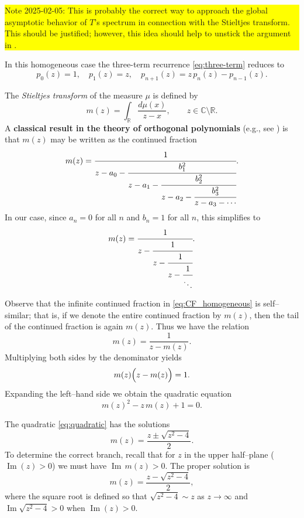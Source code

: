 \documentclass[letterpaper,11pt,oneside,reqno]{article}
\numberwithin{equation}{section}
\theoremstyle{definition}
\begin{document}
\colorbox{yellow}{\parbox{.7\textwidth}{Note 2025-02-05:
This is probably the correct way to approach the global asymptotic behavior of 
$T$'s spectrum in connection with the Stieltjes transform. 
This should be justified; however, this idea should help to unstick 
the argument in .}}

In this homogeneous case the three-term recurrence \eqref{eq:three-term} reduces to
\[
p_0(z)=1,\quad p_1(z)=z,\quad p_{n+1}(z)=z\,p_n(z)-p_{n-1}(z).
\]

\medskip
The \emph{Stieltjes transform} of the measure \(\mu\) is defined by
\[
m(z)=\int_{\mathbb{R}}\frac{d\mu(x)}{z-x},\qquad z\in\mathbb{C}\setminus\mathbb{R}.
\]
A \textbf{classical result in the theory of orthogonal polynomials}
(e.g., see \cite{sokal2020euler})
is that \(m(z)\) may be written as the continued fraction
\begin{equation}\label{eq:CF}
m(z)=\cfrac{1}{z-a_0-\cfrac{b_1^2}{z-a_1-\cfrac{b_2^2}{z-a_2-\cfrac{b_3^2}{z-a_3-\cdots}}}}.
\end{equation}
In our case, since \(a_n=0\) for all \(n\) and \(b_n=1\) for all \(n\), this simplifies to
\begin{equation}\label{eq:CF_homogeneous}
m(z)=\cfrac{1}{z-\cfrac{1}{z-\cfrac{1}{z-\cfrac{1}{\ddots}}}}.
\end{equation}


Observe that the infinite continued fraction in \eqref{eq:CF_homogeneous} is self--similar; that is, if we denote the entire continued fraction by \(m(z)\), then the tail of the continued fraction is again \(m(z)\). Thus we have the relation
\[
m(z)=\frac{1}{z-m(z)}.
\]
Multiplying both sides by the denominator yields
\[
m(z)\Bigl(z-m(z)\Bigr)=1.
\]
Expanding the left--hand side we obtain the quadratic equation
\begin{equation}\label{eq:quadratic}
m(z)^2-z\,m(z)+1=0.
\end{equation}


The quadratic \eqref{eq:quadratic} has the solutions
\[
m(z)=\frac{z\pm\sqrt{z^2-4}}{2}.
\]
To determine the correct branch, recall that for \(z\) in the upper half--plane (\(\operatorname{Im}(z)>0\)) we must have \(\operatorname{Im}\,m(z)>0\). The proper solution is
\begin{equation}\label{eq:m_solution}
m(z)=\frac{z-\sqrt{z^2-4}}{2},
\end{equation}
where the square root is defined so that \(\sqrt{z^2-4}\sim z\) as \(z\to\infty\) and \(\operatorname{Im}\sqrt{z^2-4}>0\) when \(\operatorname{Im}(z)>0\).
\end{document}
